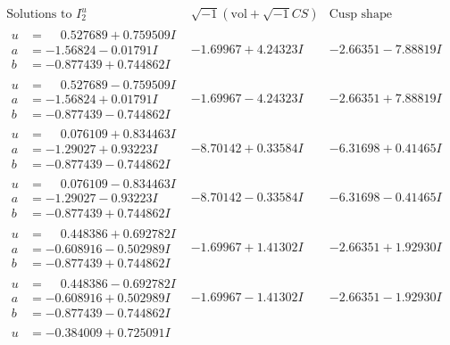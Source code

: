 \documentclass[1p]{elsarticle_modified}
\theoremstyle{definition}
\newcommand{\I}{\sqrt{-1}}
\begin{document}
$$\begin{array}{c|c|c}  
\text{Solutions to }I^u_{2}& \I (\text{vol} + \sqrt{-1}CS) & \text{Cusp shape}\\
 \hline 
\begin{aligned}
u &= \phantom{-}0.527689 + 0.759509 I \\
a &= -1.56824 - 0.01791 I \\
b &= -0.877439 + 0.744862 I\end{aligned}
 & -1.69967 + 4.24323 I & -2.66351 - 7.88819 I \\ \hline\begin{aligned}
u &= \phantom{-}0.527689 - 0.759509 I \\
a &= -1.56824 + 0.01791 I \\
b &= -0.877439 - 0.744862 I\end{aligned}
 & -1.69967 - 4.24323 I & -2.66351 + 7.88819 I \\ \hline\begin{aligned}
u &= \phantom{-}0.076109 + 0.834463 I \\
a &= -1.29027 + 0.93223 I \\
b &= -0.877439 - 0.744862 I\end{aligned}
 & -8.70142 + 0.33584 I & -6.31698 + 0.41465 I \\ \hline\begin{aligned}
u &= \phantom{-}0.076109 - 0.834463 I \\
a &= -1.29027 - 0.93223 I \\
b &= -0.877439 + 0.744862 I\end{aligned}
 & -8.70142 - 0.33584 I & -6.31698 - 0.41465 I \\ \hline\begin{aligned}
u &= \phantom{-}0.448386 + 0.692782 I \\
a &= -0.608916 - 0.502989 I \\
b &= -0.877439 + 0.744862 I\end{aligned}
 & -1.69967 + 1.41302 I & -2.66351 + 1.92930 I \\ \hline\begin{aligned}
u &= \phantom{-}0.448386 - 0.692782 I \\
a &= -0.608916 + 0.502989 I \\
b &= -0.877439 - 0.744862 I\end{aligned}
 & -1.69967 - 1.41302 I & -2.66351 - 1.92930 I \\ \hline\begin{aligned}
u &= -0.384009 + 0.725091 I \\

\end{aligned}
\end{array}$$
\end{document}
